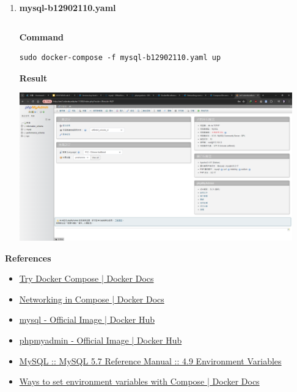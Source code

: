 \documentclass[12pt, a4paper]{article}
\begin{document}
\begin{enumerate}[resume]
    \pagebreak
    \item
    \textbf{mysql-b12902110.yaml}
    \inputminted[fontsize=\footnotesize]{yaml}{b12902110/mysql-b12902110.yaml}

    \textbf{Command}
    \begin{verbatim}
sudo docker-compose -f mysql-b12902110.yaml up
    \end{verbatim}

    \textbf{Result}

    \includegraphics[width=0.93\textwidth]{14_phpmyadmin.png}
  \end{enumerate}

  \textbf{References}
  \begin{itemize}
    \item \href{https://docs.docker.com/compose/gettingstarted/}{Try Docker Compose | Docker Docs}
    \item \href{https://docs.docker.com/compose/networking/}{Networking in Compose | Docker Docs}
    \item \href{https://hub.docker.com/_/mysql}{mysql - Official Image | Docker Hub}
    \item \href{https://hub.docker.com/_/phpmyadmin}{phpmyadmin - Official Image | Docker Hub}
    \item \href{https://dev.mysql.com/doc/refman/5.7/en/environment-variables.html}{MySQL :: MySQL 5.7 Reference Manual :: 4.9 Environment Variables}
    \item \href{https://docs.docker.com/compose/environment-variables/set-environment-variables/}{Ways to set environment variables with Compose | Docker Docs}
  \end{itemize}
\end{document}
